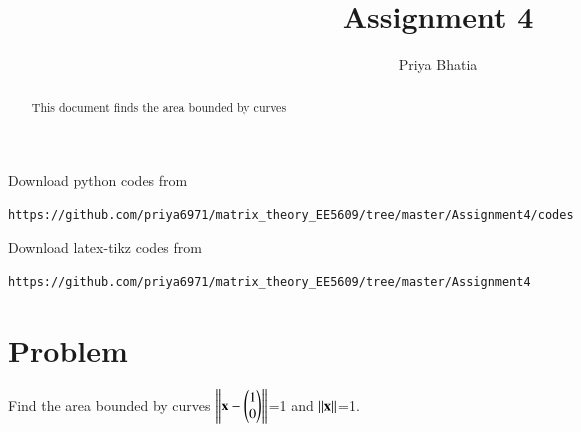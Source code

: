 \documentclass[journal,12pt,twocolumn]{IEEEtran}
\begin{document}
     \def\rightbox#1{\makebox[0in][r]{#1}}
     \def\centbox#1{\makebox[0in]{#1}}
     \def\topbox#1{\raisebox{-\baselineskip}[0in][0in]{#1}}
     \def\midbox#1{\raisebox{-0.5\baselineskip}[0in][0in]{#1}}
\vspace{3cm}
\title{Assignment 4}
\author{Priya Bhatia}
\maketitle
\newpage
\bigskip
\renewcommand{\thefigure}{\theenumi}
\renewcommand{\thetable}{\theenumi}
\begin{abstract}
This document finds the area bounded by curves
\end{abstract}
%
Download python codes from 
%
\begin{lstlisting}
https://github.com/priya6971/matrix_theory_EE5609/tree/master/Assignment4/codes
\end{lstlisting}
%
%
Download latex-tikz codes from 
%
\begin{lstlisting}
https://github.com/priya6971/matrix_theory_EE5609/tree/master/Assignment4
\end{lstlisting}
%
\section{\textbf{Problem}}
Find the area bounded by curves $\left\lVert\mathbf{x}-\begin{pmatrix}1\\0\end{pmatrix}\right\rVert$=1 and $\left\lVert\mathbf{x}\right\rVert$=1.
\end{document}
